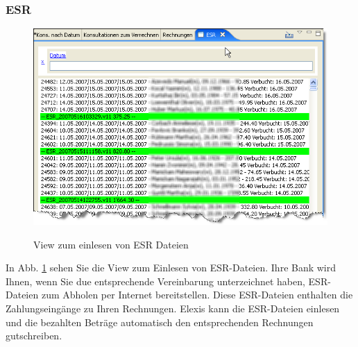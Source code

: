 \subsubsection{ESR}
\begin{figure}[hb]
  \includegraphics{images/esr1}\\
  \caption{View zum einlesen von ESR Dateien}\label{fig:esr}
\end{figure}

In Abb. \ref{fig:esr} sehen Sie die View zum Einlesen von ESR-Dateien. Ihre Bank wird Ihnen, wenn Sie due entsprechende Vereinbarung unterzeichnet haben, ESR-Dateien zum Abholen per Internet bereitstellen. Diese ESR-Dateien enthalten die Zahlungseingänge zu Ihren Rechnungen. Elexis kann die ESR-Dateien einlesen und die bezahlten Beträge automatisch den entsprechenden Rechnungen gutschreiben.

